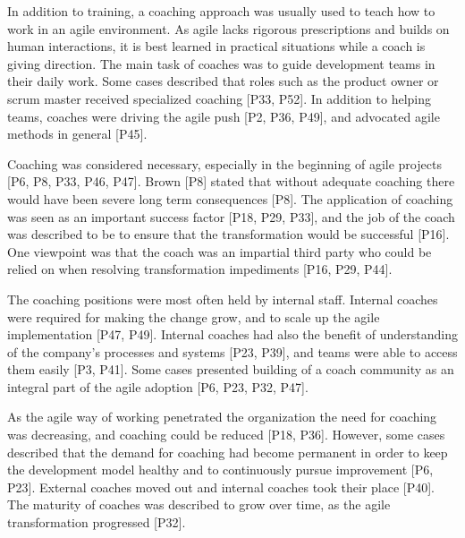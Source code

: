 \documentclass[preprint,authoryear,12pt]{elsarticle}
\begin{document}

In addition to training, a coaching approach was usually used to teach how to
work in an agile environment. As agile lacks rigorous prescriptions and builds
on human interactions, it is best learned in practical situations while a coach
is giving direction.
The main task of coaches was to guide development teams in their daily work.
Some cases described that roles such as the product owner or scrum master
received specialized coaching [P33, P52].
In addition to helping teams, coaches were driving the agile push [P2, P36,
P49], and advocated agile methods in general [P45].

Coaching was considered necessary, especially in the beginning of agile projects
[P6, P8, P33, P46, P47]. Brown [P8] stated that without adequate coaching there
would have been severe long term consequences [P8]. The application of coaching
was seen as an important success factor [P18, P29, P33], and the job of the
coach was described to be to ensure that the transformation would be successful
[P16]. One viewpoint was that the coach was an impartial third party who could
be relied on when resolving transformation impediments [P16, P29, P44].


The coaching positions were most often held by internal staff.
Internal coaches were required for making the change grow, and to scale up the
agile implementation [P47, P49]. Internal coaches had also the benefit of
understanding of the company's processes and systems [P23, P39], and teams were
able to access them easily [P3, P41]. Some cases presented building of a coach
community as an integral part of the agile adoption [P6, P23, P32, P47].

As the agile way of working penetrated the organization the need for coaching
was decreasing, and coaching could be reduced [P18, P36]. However, some cases
described that the demand for coaching had become permanent in order to keep the
development model healthy and to continuously pursue improvement [P6, P23].
External coaches moved out and internal coaches took their place [P40].
The maturity of coaches was described to grow over time, as the agile
transformation progressed [P32].



\end{document}
